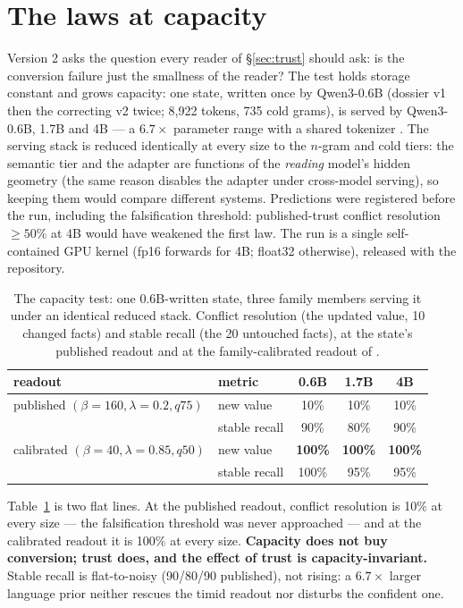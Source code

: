 \documentclass[11pt]{article}
\begin{document}
\section{The laws at capacity}\label{sec:capacity}

Version 2 asks the question every reader of \S\ref{sec:trust} should ask: is the conversion failure just the smallness of the reader? The test holds storage constant and grows capacity: one state, written once by Qwen3-0.6B (dossier v1 then the correcting v2 twice; 8{,}922 tokens, 735 cold grams), is served by Qwen3-0.6B, 1.7B and 4B --- a $6.7\times$ parameter range with a shared tokenizer \cite{drafter}. The serving stack is reduced identically at every size to the $n$-gram and cold tiers: the semantic tier and the adapter are functions of the \emph{reading} model's hidden geometry (the same reason \cite{drafter} disables the adapter under cross-model serving), so keeping them would compare different systems. Predictions were registered before the run, including the falsification threshold: published-trust conflict resolution $\geq 50\%$ at 4B would have weakened the first law. The run is a single self-contained GPU kernel (fp16 forwards for 4B; float32 otherwise), released with the repository.

\begin{table}[t]
\centering\small
\caption{The capacity test: one 0.6B-written state, three family members serving it under an identical reduced stack. Conflict resolution (the updated value, 10 changed facts) and stable recall (the 20 untouched facts), at the state's published readout and at the family-calibrated readout of \cite{drafter}.}
\label{tab:capacity}
\begin{tabular}{@{}llccc@{}}
\toprule
readout & metric & 0.6B & 1.7B & 4B\\
\midrule
published $(\beta{=}160,\lambda{=}0.2,q75)$ & new value & 10\% & 10\% & 10\%\\
 & stable recall & 90\% & 80\% & 90\%\\
calibrated $(\beta{=}40,\lambda{=}0.85,q50)$ & new value & \textbf{100\%} & \textbf{100\%} & \textbf{100\%}\\
 & stable recall & 100\% & 95\% & 95\%\\
\bottomrule
\end{tabular}
\end{table}

Table~\ref{tab:capacity} is two flat lines. At the published readout, conflict resolution is 10\% at every size --- the falsification threshold was never approached --- and at the calibrated readout it is 100\% at every size. \textbf{Capacity does not buy conversion; trust does, and the effect of trust is capacity-invariant.} Stable recall is flat-to-noisy (90/80/90 published), not rising: a $6.7\times$ larger language prior neither rescues the timid readout nor disturbs the confident one.
\end{document}

